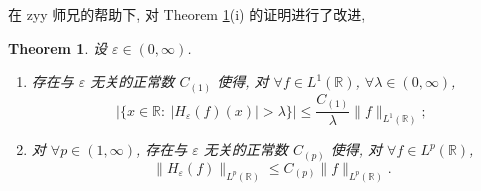 \documentclass[a4paper,11pt]{article}
\newtheorem{theorem}{Theorem}[section]
\theoremstyle{definition}
\begin{document}
在 zyy 师兄的帮助下, 对 Theorem \ref{thm1}(i) 的证明进行了改进,

\begin{theorem} \label{thm1}
    设 $ \varepsilon \in (0, \infty) $. 
    \begin{enumerate}[{\rm(i)}]
        \item 存在与 $ \varepsilon $ 无关的正常数 $ C_{(1)} $ 使得, 
            对 $ \forall f \in L^1(\mathbb{R}) $, $ \forall \lambda \in (0, \infty) $,
            $$ 
                |\{ x \in \mathbb{R} :\ |H_\varepsilon (f) (x)| > \lambda \}| 
                    \leq \frac{C_{(1)}}{\lambda} \| f \|_{L^1(\mathbb{R})};
            $$
        \item 对 $ \forall p \in (1, \infty) $, 存在与 $ \varepsilon $ 无关的正常数 $ C_{(p)} $ 使得, 
            对 $ \forall f \in L^p(\mathbb{R}) $, 
            $$ 
                \| H_\varepsilon (f) \|_{L^p(\mathbb{R})} \leq C_{(p)} \| f \|_{L^p(\mathbb{R})}.
            $$
    \end{enumerate}
\end{theorem}
\end{document}
